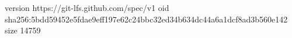 version https://git-lfs.github.com/spec/v1
oid sha256:5bdd59452e5fdae9eff197e62c24bbc32ed34b634dc44a6a1dcf8ad3b560e142
size 14759

